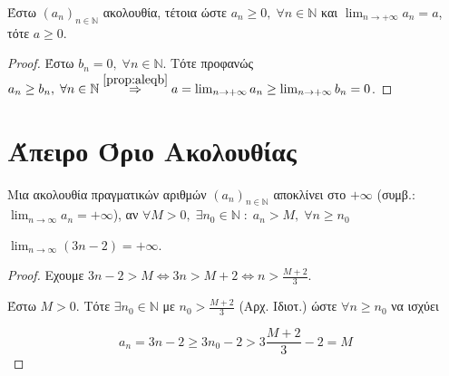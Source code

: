 \documentclass[a4paper,table]{report}
\begin{document}
\begin{cor}
  Έστω $ (a_{n})_{n \in \mathbb{N}} $ ακολουθία, τέτοια ώστε 
  $ a_{n} \geq 0, \; \forall n \in \mathbb{N} $ και 
  $ \lim_{n \to +\infty} a_{n} = a$, τότε $ a \geq 0 $.
\end{cor}
\begin{proof}
  Έστω $ b_{n} = 0, \; \forall n \in \mathbb{N} $. Τότε προφανώς 
  $ a_{n} \geq b_{n}, \; \forall n
  \in \mathbb{N} \overset{\ref{prop:aleqb}}{\Rightarrow} 
  a = \lim_{n \to +\infty} a_{n} \geq \lim_{n \to +\infty} b_{n} = 0$.
\end{proof}


\section{Άπειρο Όριο Ακολουθίας}

\begin{mybox1}
  \begin{dfn}
    Μια ακολουθία πραγματικών αριθμών $ (a_{n})_{n \in \mathbb{N}} $ 
    \textcolor{Col1}{αποκλίνει} στο $ +\infty $ (συμβ.: 
    $ \lim_{n \to \infty} a_{n} = + 
    \infty $), αν $ \forall M>0, \; \exists n_{0} \in 
    \mathbb{N} \; : \; a_{n} > M, \; \forall n \geq n_{0}$
  \end{dfn}
\end{mybox1}

\begin{example}
  $ \lim_{n \to \infty} (3n-2)=+\infty $. 
\end{example}
\begin{proof}
  \item {}

    Εχουμε $ 3n-2>M \Leftrightarrow 3n >M+2 \Leftrightarrow n > \frac{M+2}{3} $.

    Έστω $ M > 0 $. Τότε $ \exists n_{0} \in \mathbb{N} $ με $ n_{0}> \frac{M+2}{3} $
    (Αρχ. Ιδιοτ.) ώστε $ \forall n \geq n_{0} $ να ισχύει 


   \[
     a_{n}= 3n-2 \geq 3 n_{0}-2 > 3 \frac{M+2}{3} - 2 = M 
    \]


\end{proof}
\end{document}
